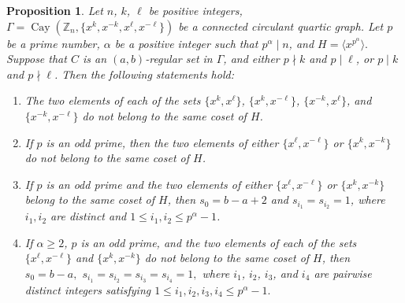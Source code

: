 \documentclass[12pt]{article}
\newtheorem{prop}[formula]{Proposition}
\begin{document}
\begin{prop}\label{prop:podd2}
	Let $n$, $k$, $\ell$ be positive integers,
	$
	\Gamma=\operatorname{Cay}(\mathbb{Z}_n,\{x^k,x^{-k},x^\ell,x^{-\ell}\})
	$
	be a connected circulant quartic graph. Let $p$ be a prime number, $\alpha$ be a positive integer such that $p^\alpha\mid n$, and
	$
	H=\langle x^{p^\alpha}\rangle.
	$
    Suppose that \(C\) is an \((a,b)\)-regular set in \(\Gamma\), and either \(p\nmid k\) and \(p\mid\ell\), or \(p\mid k\) and \(p\nmid\ell\).
	Then the following statements hold:
	\begin{enumerate}
		\item[(i)] The two elements of each of the sets $\{x^k,x^\ell\}$, $\{x^k,x^{-\ell}\}$, $\{x^{-k},x^\ell\}$, and $\{x^{-k},x^{-\ell}\}$ do not belong to the same coset of $H$.
		\item[(ii)] If \(p\) is an odd prime, then the two elements of either  \(\{x^\ell,x^{-\ell}\}\) or \(\{x^k,x^{-k}\}\) do not belong to the same coset of \(H\).
		\item[(iii)] If \(p\) is an odd prime and the two elements of either $\{x^\ell,x^{-\ell}\}$ or $\{x^k,x^{-k}\}$ belong to the same coset of $H$, then \(s_0=b-a+2\) and \(s_{i_1}=s_{i_2}=1\), where \(i_1,i_2\) are distinct and \(1\le i_1,i_2\le p^\alpha-1\).
		\item[(iv)] If $\alpha\geq 2$, \(p\) is an odd prime, and the two elements of each of the sets $\{x^{\ell},x^{-\ell}\}$ and $\{x^k,x^{-k}\}$ do not belong to the same coset of $H$, then
     	$
      	s_0=b-a,$ $ s_{i_1}=s_{i_2}=s_{i_3}=s_{i_4}=1,$
    	where $i_1$, $i_2$, $i_3$, and $i_4$ are pairwise distinct integers satisfying
      	$
     	1\le i_1,i_2,i_3,i_4\le p^\alpha-1.
    	$
	\end{enumerate}
\end{prop}
\end{document}
